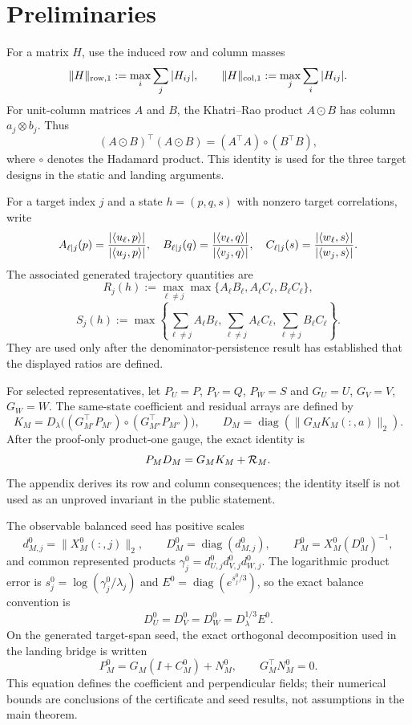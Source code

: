 \section{Preliminaries}\label{sec:preliminaries}

For a matrix $H$, use the induced row and column masses
\[
 \|H\|_{\rm row,1}:=\max_i\sum_j|H_{ij}|,\qquad
 \|H\|_{\rm col,1}:=\max_j\sum_i|H_{ij}|.
\]
For unit-column matrices $A$ and $B$, the Khatri--Rao product $A\odot B$
has column $a_j\otimes b_j$. Thus
\[
 (A\odot B)^\top(A\odot B)=(A^\top A)\circ(B^\top B),
\]
where $\circ$ denotes the Hadamard product. This identity is used for the
three target designs in the static and landing arguments.

For a target index $j$ and a state $h=(p,q,s)$ with nonzero target
correlations, write
\[
 A_{\ell\mid j}(p)={|\langle u_\ell,p\rangle|\over
 |\langle u_j,p\rangle|},\quad
 B_{\ell\mid j}(q)={|\langle v_\ell,q\rangle|\over
 |\langle v_j,q\rangle|},\quad
 C_{\ell\mid j}(s)={|\langle w_\ell,s\rangle|\over
 |\langle w_j,s\rangle|}.
\]
The associated generated trajectory quantities are
\[
 R_j(h):=\max_{\ell\ne j}\max\{A_\ell B_\ell,A_\ell C_\ell,B_\ell C_\ell\},
\]
\[
 S_j(h):=\max\left\{\sum_{\ell\ne j}A_\ell B_\ell,
 \sum_{\ell\ne j}A_\ell C_\ell,
 \sum_{\ell\ne j}B_\ell C_\ell\right\}.
\]
They are used only after the denominator-persistence result has established
that the displayed ratios are defined.

For selected representatives, let $P_U=P$, $P_V=Q$, $P_W=S$ and
$G_U=U$, $G_V=V$, $G_W=W$. The same-state coefficient and residual arrays
are defined by
\[
 K_M=D_\lambda\bigl((G_{M'}^\top P_{M'})\circ
 (G_{M''}^\top P_{M''})\bigr),\qquad
 D_M=\operatorname{diag}(\|G_MK_M(:,a)\|_2).
\]
After the proof-only product-one gauge, the exact identity is
\[
 P_MD_M=G_MK_M+{\cal R}_M.
\]
The appendix derives its row and column consequences; the identity itself is
not used as an unproved invariant in the public statement.

The observable balanced seed has positive scales
\[
 d_{M,j}^0=\|X_M^0(:,j)\|_2,\qquad
 D_M^0=\operatorname{diag}(d_{M,j}^0),\qquad
 P_M^0=X_M^0(D_M^0)^{-1},
\]
and common represented products
$\gamma_j^0=d_{U,j}^0d_{V,j}^0d_{W,j}^0$.  The logarithmic product error is
$s_j^0=\log(\gamma_j^0/\lambda_j)$ and
$E^0=\operatorname{diag}(e^{s_j^0/3})$, so the exact balance convention is
\[
 D_U^0=D_V^0=D_W^0=D_\lambda^{1/3}E^0.
\]
On the generated target-span seed, the exact orthogonal decomposition used
in the landing bridge is written
\[
 P_M^0=G_M(I+C_M^0)+N_M^0,\qquad G_M^\top N_M^0=0.
\]
This equation defines the coefficient and perpendicular fields; their
numerical bounds are conclusions of the certificate and seed results, not
assumptions in the main theorem.

